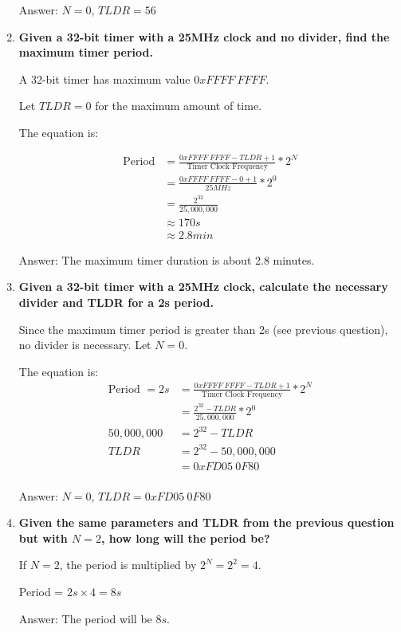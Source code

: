 \documentclass[10pt, oneside, letterpaper]{article}
\begin{document}
\begin{enumerate}
		Answer: $N = 0$, $TLDR = 56$
	
		\vspace{1cm}
		
		

		\item \textbf{Given a 32-bit timer with a 25MHz clock and no divider, find the maximum timer period.}
	
		A 32-bit timer has maximum value $0xFFFF\ FFFF$.

		Let $TLDR = 0$ for the maximum amount of time.
	
		The equation is:
	
		\begin{align}
			\textrm{Period}
			&= \frac{0xFFFF\ FFFF - TLDR + 1}{\textrm{Timer Clock Frequency}} * 2^N \\
			&= \frac{0xFFFF\ FFFF - 0 + 1}{25MHz} * 2^0 \\
			&= \frac{2^{32}}{25,000,000} \\
			&\approx 170s \\
			&\approx 2.8 min
		\end{align}
	
		Answer: The maximum timer duration is about 2.8 minutes.
		
		\vspace{1cm}
		\clearpage
		
		

		\item \textbf{Given a 32-bit timer with a 25MHz clock, calculate the necessary divider and TLDR for a 2s period.}
	
		Since the maximum timer period is greater than 2s (see previous question), no divider is necessary. Let $N = 0$.
	
		The equation is:
		\begin{align}
			\textrm{Period } = 2s
			&= \frac{0xFFFF\ FFFF - TLDR + 1}{\textrm{Timer Clock Frequency}} * 2^N \\
			&= \frac{2^{32} - TLDR}{25,000,000} * 2^0 \\
			50,000,000
			&= 2^{32} - TLDR \\
			TLDR
			&= 2^{32} - 50,000,000 \\
			&= 0xFD05\ 0F80 \\
		\end{align}

		Answer: $N = 0$, $TLDR = 0xFD05\ 0F80$
		
		\vspace{1cm}
		
		
		
		\item \textbf{Given the same parameters and TLDR from the previous question but with $N = 2$, how long will the period be?}
	
		If $N = 2$, the period is multiplied by $2^N = 2^2 = 4$.
		
		Period = $2s \times 4 = 8s$
	
		Answer: The period will be $8s$.

	\end{enumerate}
\end{document}

